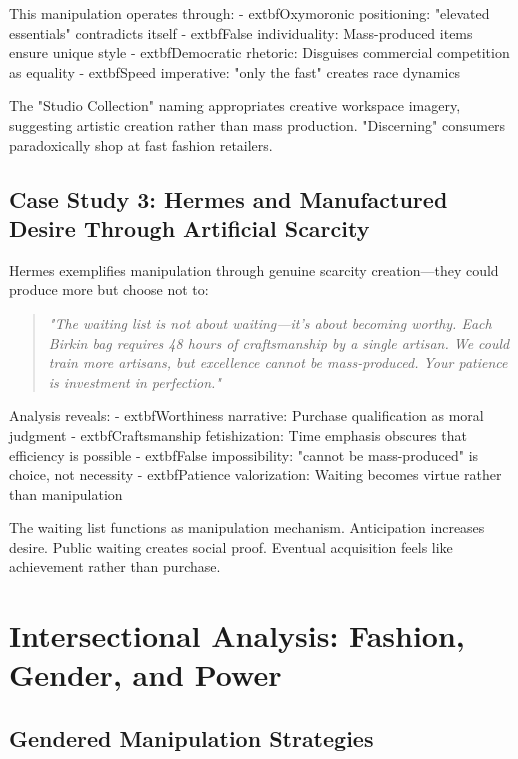 This manipulation operates through:
- 	extbf{Oxymoronic positioning}: "elevated essentials" contradicts itself
- 	extbf{False individuality}: Mass-produced items ensure unique style
- 	extbf{Democratic rhetoric}: Disguises commercial competition as equality
- 	extbf{Speed imperative}: "only the fast" creates race dynamics

The "Studio Collection" naming appropriates creative workspace imagery, suggesting artistic creation rather than mass production. "Discerning" consumers paradoxically shop at fast fashion retailers.

\subsection{Case Study 3: Hermes and Manufactured Desire Through Artificial Scarcity}

Hermes exemplifies manipulation through genuine scarcity creation—they could produce more but choose not to:

\begin{quote}
\textit{"The waiting list is not about waiting—it's about becoming worthy. Each Birkin bag requires 48 hours of craftsmanship by a single artisan. We could train more artisans, but excellence cannot be mass-produced. Your patience is investment in perfection."}
\end{quote}

Analysis reveals:
- 	extbf{Worthiness narrative}: Purchase qualification as moral judgment
- 	extbf{Craftsmanship fetishization}: Time emphasis obscures that efficiency is possible
- 	extbf{False impossibility}: "cannot be mass-produced" is choice, not necessity
- 	extbf{Patience valorization}: Waiting becomes virtue rather than manipulation

The waiting list functions as manipulation mechanism. Anticipation increases desire. Public waiting creates social proof. Eventual acquisition feels like achievement rather than purchase.

\section{Intersectional Analysis: Fashion, Gender, and Power}
\label{sec:fashion_intersect}

\subsection{Gendered Manipulation Strategies}

